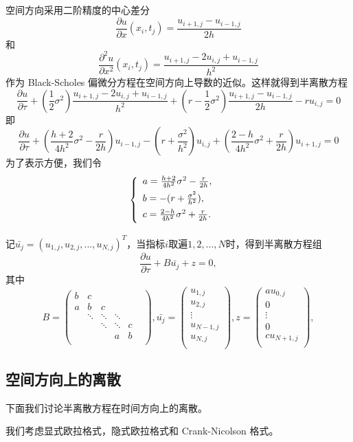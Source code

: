 \documentclass{article}
\begin{document}
空间方向采用二阶精度的中心差分
$$\frac{\partial u}{\partial x}(x_i, t_j) = \frac{u_{i+1, j} - u_{i-1, j}}{2h}$$
和
$$\frac{\partial^2 u}{\partial x^2}(x_i, t_j) = \frac{u_{i+1, j} - 2u_{i, j} + u_{i-1, j}}{h^2}$$
作为 Black-Scholes 偏微分方程在空间方向上导数的近似。这样就得到半离散方程
$$\frac{\partial u}{\partial \tau} + (\frac{1}{2}\sigma^2)\frac{u_{i+1, j} - 2u_{i, j} + u_{i-1, j}}{h^2} + (r - \frac{1}{2}\sigma^2)\frac{u_{i+1, j} - u_{i-1, j}}{2h} - ru_{i, j} = 0$$
即$$\frac{\partial u}{\partial \tau} + (\frac{h+2}{4h^2}\sigma^2 - \frac{r}{2h})u_{i-1, j} - (r + \frac{\sigma^2}{h^2})u_{i, j} + (\frac{2-h}{4h^2}\sigma^2 + \frac{r}{2h})u_{i+1, j} = 0$$
为了表示方便，我们令
\begin{equation}
\left\{
        \begin{array}{lr}
        \vspace{1ex}
        a = \frac{h+2}{4h^2}\sigma^2 - \frac{r}{2h}, & \\
        \vspace{1ex}
        b = - (r + \frac{\sigma^2}{h^2}), & \\
        \vspace{1ex}
        c = \frac{2-h}{4h^2}\sigma^2 + \frac{r}{2h}. &  
        \end{array}
\right.
\nonumber
\end{equation}

记$\bar{u_j} = (u_{1, j}, u_{2, j},...,u_{N, j})^T$，当指标$i$取遍$1,2,...,N$时，得到半离散方程组
$$\frac{\partial u}{\partial \tau} + B\bar{u_j} + z = 0, $$
其中$$B = 
\begin{pmatrix}
    b &   c    &        &        &   & \\
    a &   b    &   c    &        &   & \\
      & \ddots & \ddots & \ddots &   & \\
      &        & \ddots & \ddots & c & \\
      &        &        &   a    & b & \\
\end{pmatrix},
\bar{u_j} = 
\begin{pmatrix}
    u_{1, j}   \\
    u_{2, j}   \\
    \vdots     \\
    u_{N-1, j} \\
    u_{N, j}   \\
\end{pmatrix},
z = 
\begin{pmatrix}
    au_{0, j}   \\
    0           \\
    \vdots      \\
    0           \\
    cu_{N+1, j} \\
\end{pmatrix},
$$


\subsection{空间方向上的离散}

下面我们讨论半离散方程在时间方向上的离散。

我们考虑显式欧拉格式，隐式欧拉格式和 Crank-Nicolson 格式。
\end{document}
